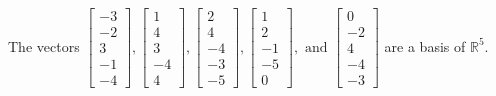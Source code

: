 \begin{exercise}
\begin{exerciseStatement}
  \end{exerciseStatement}
  \begin{exerciseAnswer}
   The vectors \(\left[\begin{array}{r}
-3 \\
-2 \\
3 \\
-1 \\
-4
\end{array}\right] , \left[\begin{array}{r}
1 \\
4 \\
3 \\
-4 \\
4
\end{array}\right] , \left[\begin{array}{r}
2 \\
4 \\
-4 \\
-3 \\
-5
\end{array}\right] , \left[\begin{array}{r}
1 \\
2 \\
-1 \\
-5 \\
0
\end{array}\right] , \text{ and } \left[\begin{array}{r}
0 \\
-2 \\
4 \\
-4 \\
-3
\end{array}\right]\) 
  	 are  a basis of \(\mathbb{R}^5\).
  


  \end{exerciseAnswer}
\end{exercise}